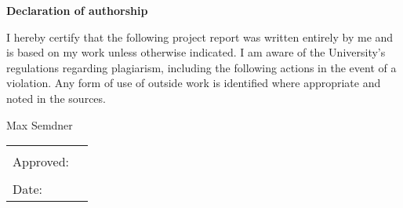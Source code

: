 \begin{center}
\large
\textbf{Declaration of authorship
}\end{center}

\noindent I hereby certify that the following project report was written entirely by me and is based on my work unless otherwise indicated. I am aware of the University's regulations regarding plagiarism, including the following actions in the event of a violation. Any form of use of outside work is identified where appropriate and noted in the sources.

\vspace{1cm}

\begin{center}
\large
Max Semdner
\end{center}

\begin{tabular}{p{5cm}p{10cm}}
& \\
Approved: & \hrulefill \\
& \\
Date: & \hrulefill \\
\end{tabular}